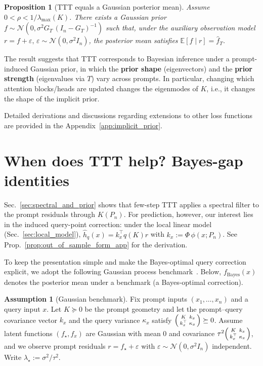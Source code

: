 \documentclass{article}
\theoremstyle{plain}
\newtheorem{proposition}[theorem]{Proposition}
\theoremstyle{definition}
\newtheorem{assumption}[theorem]{Assumption}
\theoremstyle{remark}
\begin{document}
\begin{proposition}[TTT equals a Gaussian posterior mean]
\label{thm:implicit_prior_sec4}
Assume $0<\rho<1/\lambda_{\max}(K)$.
There exists a Gaussian prior $f\sim\mathcal{N}(0,\sigma^2 G_T\,(I_n-G_T)^{-1})$ such that, under the auxiliary observation model $r = f + \varepsilon,\, \varepsilon\sim\mathcal{N}(0,\sigma^2 I_n)$, the posterior mean satisfies $\mathbb{E}[f\mid r] = \hat f_T$.
\end{proposition}

The result suggests that TTT corresponds to Bayesian inference under a prompt-induced Gaussian prior, in which the \textbf{prior shape} (eigenvectors) and the \textbf{prior strength} (eigenvalues via $T$) vary across prompts. In particular, changing which attention blocks/heads are updated changes the eigenmodes of $K$, i.e., it changes the shape of the implicit prior. 

Detailed derivations and discussions regarding extensions to other loss functions are provided in the Appendix~\ref{app:implicit_prior}.

\section{When does TTT help? Bayes-gap identities}
\label{sec:bayes_gap}
Sec.~\ref{sec:spectral_and_prior} shows that few-step TTT applies a spectral filter to the prompt residuals through $K(P_n)$. For prediction, however, our interest lies in the induced query-point correction: under the local linear model (Sec.~\ref{sec:local_model}), $\hat h_q(x)=k_x^\top q(K)r$ with $k_x:=\Phi\,\phi(x;P_n)$. See Prop.~\ref{prop:out_of_sample_form_app} for the derivation.


To keep the presentation simple and make the Bayes-optimal query correction explicit, we adopt the following Gaussian process benchmark~\citep{RasmussenWilliams2006GPML}. Below, $f_{\mathrm{Bayes}}(x)$ denotes the posterior mean under a benchmark (a Bayes-optimal correction).


\begin{assumption}[Gaussian benchmark]
\label{assump:gp_benchmark}
Fix prompt inputs $(x_1,\dots,x_n)$ and a query input $x$. Let $K\succeq 0$ be the prompt geometry and let the prompt–query covariance vector $k_x$ and the query variance $\kappa_x$ satisfy $\begin{psmallmatrix}K&k_x\\k_x^\top&\kappa_x\end{psmallmatrix}\succeq 0$. Assume latent functions $(f_\star,f_x)$ are Gaussian with mean $0$ and covariance $\tau^2\begin{psmallmatrix}K&k_x\\k_x^\top&\kappa_x\end{psmallmatrix}$, and we observe prompt residuals $r=f_\star+\varepsilon$ with $\varepsilon\sim\mathcal{N}(0,\sigma^2 I_n)$ independent. Write $\lambda_\star:=\sigma^2/\tau^2$.
\end{assumption}
\end{document}
